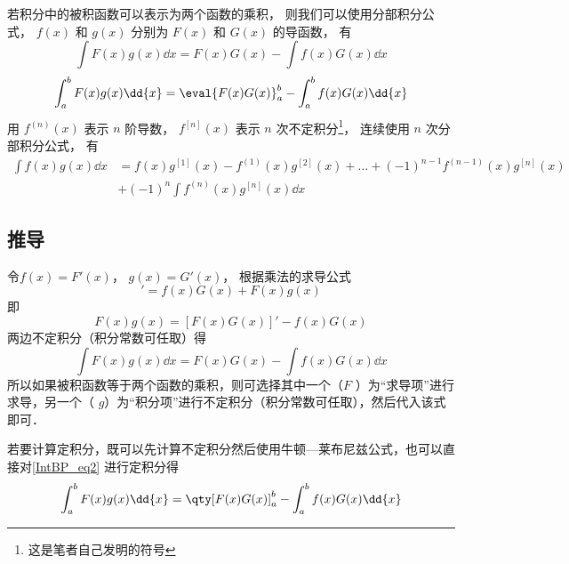 

若积分中的被积函数可以表示为两个函数的乘积， 则我们可以使用分部积分公式， $f(x)$ 和 $g(x)$ 分别为 $F(x)$ 和 $G(x)$ 的导函数， 有
\begin{equation}\label{IntBP_eq1}
\int F(x)g(x)\dd{x}  = F(x)G(x) - \int f(x)G(x)\dd{x}
\end{equation}
\begin{equation}
\int_a^b F(x)g(x) \dd{x}  = \eval{F(x)G(x)}_a^b - \int_a^b f(x)G(x) \dd{x}
\end{equation}
用 $f^{(n)}(x)$ 表示 $n$ 阶导数，  $f^{[n]}(x)$ 表示 $n$ 次不定积分\footnote{这是笔者自己发明的符号}， 连续使用 $n$ 次分部积分公式， 有
\begin{equation}
\begin{aligned}
\int f(x)g(x) \dd{x} &= f(x)g^{[1]}(x) - f^{(1)}(x)g^{[2]}(x) + \dots + (-1)^{n-1} f^{(n-1)}(x) g^{[n]}(x)\\
 &+ (-1)^n \int f^{(n)}(x) g^{[n]}(x) \dd{x}
\end{aligned}
\end{equation}

\subsection{推导}
令$f(x) = F'(x)$，  $g(x) = G'(x)$， 根据乘法的求导公式%
\begin{equation}
[F(x)G(x)]' = f(x)G(x) + F(x)g(x)
\end{equation}
即
\begin{equation}\label{IntBP_eq2}
F(x)g(x) = [F(x)G(x)]' - f(x)G(x)
\end{equation}
两边不定积分（积分常数可任取）得
\begin{equation}\label{IntBP_eq6}
\int F(x)g(x) \dd{x}  = F(x)G(x) - \int f(x)G(x) \dd{x}
\end{equation}
所以如果被积函数等于两个函数的乘积，则可选择其中一个（$F$ ）为“求导项”进行求导，另一个（ $g$）为“积分项”进行不定积分（积分常数可任取），然后代入该式即可．

若要计算定积分，既可以先计算不定积分然后使用牛顿—莱布尼兹公式，也可以直接对\autoref{IntBP_eq2} 进行定积分得
\begin{equation}\label{IntBP_eq4}
\int_a^b F(x)g(x) \dd{x}  = \qty[ F(x)G(x) ]_a^b - \int_a^b f(x)G(x) \dd{x}
\end{equation}


